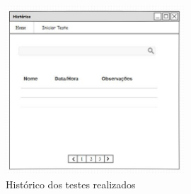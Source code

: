 	
	\begin{figure}[h]
		\centering
		\includegraphics[width=0.6\textwidth]{resource/historico.eps}
		\caption{Histórico dos testes realizados}
		\label{img:historico}
	\end{figure}

\newpage
\newpage


